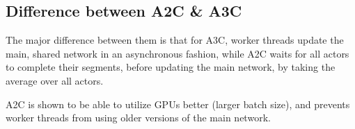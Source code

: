 \documentclass[12pt]{article} %
\begin{document}
\subsection{Difference between A2C \& A3C}
The major difference between them is that for A3C, worker threads update the main, shared network in an asynchronous fashion, while A2C waits for all actors to complete their segments, before updating the main network, by taking the average over all actors.

A2C is shown to be able to utilize GPUs better (larger batch size), and prevents worker threads from using older versions of the main network.

\end{document}
